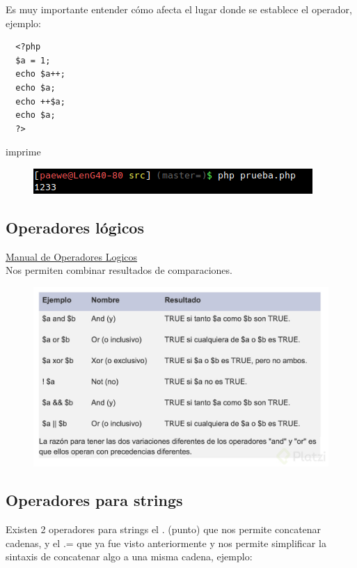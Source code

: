 \documentclass{article}
\begin{document}
Es muy importante entender cómo afecta el lugar donde se establece el operador, ejemplo:

\begin{verbatim}
  <?php
  $a = 1;
  echo $a++;
  echo $a;
  echo ++$a;
  echo $a;
  ?>
\end{verbatim}

imprime

\begin{figure}[h!]
  \centering
  \includegraphics[scale=0.75]{./Pictures/025_operadores.png}
\end{figure}

\subsection*{Operadores lógicos}%
\href{http://php.net/manual/es/language.operators.logical.php}{Manual de Operadores Logicos}\\

Nos permiten combinar resultados de comparaciones.\\

\begin{figure}[h!]
  \centering
  \includegraphics[scale=0.3]{./Pictures/026_operadores.jpg}
\end{figure}

\subsection*{Operadores para strings}%
Existen 2 operadores para strings el . (punto) que nos permite concatenar
cadenas, y el .= que ya fue visto anteriormente y nos permite simplificar la
sintaxis de concatenar algo a una misma cadena, ejemplo:\\
\end{document}

